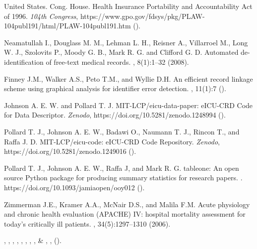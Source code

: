 \documentclass[english]{article}
\begin{document}
\begin{thebibliography}{1}
United States. Cong. House.
\newblock Health Insurance Portability and Accountability Act of 1996.
\newblock \emph{104th Congress}, https://www.gpo.gov/fdsys/pkg/PLAW-104publ191/html/PLAW-104publ191.htm ().

Neamatullah I., Douglass M. M., Lehman L. H., Reisner A., Villarroel M., Long W. J., Szolovits P., Moody G. B., Mark R. G. and Clifford G. D.
\newblock Automated de-identification of free-text medical records.
, 8(1):1--32 (2008).

Finney J.M., Walker A.S., Peto T.M., and Wyllie D.H.
\newblock An efficient record linkage scheme using graphical analysis for
  identifier error detection.
, 11(1):7 ().

Johnson A. E. W. and Pollard T. J.
\newblock MIT-LCP/eicu-data-paper: eICU-CRD Code for Data Descriptor.
\newblock \emph{Zenodo}, https://doi.org/10.5281/zenodo.1248994 ().

Pollard T. J., Johnson A. E. W., Badawi O., Naumann T. J., Rincon T., and Raffa J. D.
\newblock MIT-LCP/eicu-code: eICU-CRD Code Repository.
\newblock \emph{Zenodo}, https://doi.org/10.5281/zenodo.1249016 ().

Pollard T. J., Johnson A. E. W., Raffa J, and Mark R. G.
\newblock tableone: An open source Python package for producing summary statistics for research papers.
. https://doi.org/10.1093/jamiaopen/ooy012 ().

Zimmerman J.E., Kramer A.A., McNair D.S., and Malila F.M.
\newblock Acute physiology and chronic health evaluation ({APACHE}) {IV}: hospital
  mortality assessment for today’s critically ill patients.
, 34(5):1297--1310 (2006).

, ,
, ,
, ,
, ,
 \& ,
\newblock {}
\newblock \emph{}
  \textbf{}, 
  ().


\end{thebibliography}
\end{document}
